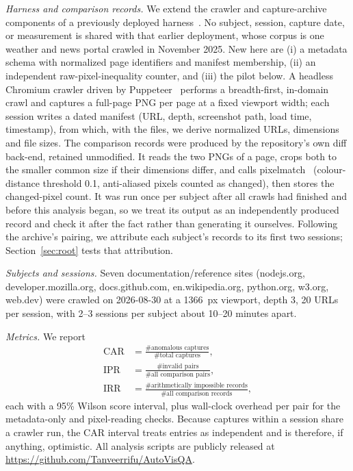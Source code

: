 \documentclass[conference]{IEEEtran}
\begin{document}
\textit{Harness and comparison records.} We extend the crawler and capture-archive components of a previously deployed harness~\cite{avqrepo}. No subject, session, capture date, or measurement is shared with that earlier deployment, whose corpus is one weather and news portal crawled in November 2025. New here are (i) a metadata schema with normalized page identifiers and manifest membership, (ii) an independent raw-pixel-inequality counter, and (iii) the pilot below. A headless Chromium crawler driven by Puppeteer~\cite{puppeteer} performs a breadth-first, in-domain crawl and captures a full-page PNG per page at a fixed viewport width; each session writes a dated manifest (URL, depth, screenshot path, load time, timestamp), from which, with the files, we derive normalized URLs, dimensions and file sizes. The comparison records were produced by the repository's own diff back-end, retained unmodified. It reads the two PNGs of a page, crops both to the smaller common size if their dimensions differ, and calls pixelmatch~\cite{pixelmatch} (colour-distance threshold 0.1, anti-aliased pixels counted as changed), then stores the changed-pixel count. It was run once per subject after all crawls had finished and before this analysis began, so we treat its output as an independently produced record and check it after the fact rather than generating it ourselves. Following the archive's pairing, we attribute each subject's records to its first two sessions; Section~\ref{sec:root} tests that attribution.

\textit{Subjects and sessions.} Seven documentation/reference sites (nodejs.org, developer.mozilla.org, docs.github.com, en.wikipedia.org, python.org, w3.org, web.dev) were crawled on 2026-08-30 at a 1366~px viewport, depth 3, 20 URLs per session, with 2--3 sessions per subject about 10--20 minutes apart.

\textit{Metrics.} We report
\begin{align}
\mathrm{CAR}&=\frac{\#\text{anomalous captures}}{\#\text{total captures}},\\
\mathrm{IPR}&=\frac{\#\text{invalid pairs}}{\#\text{all comparison pairs}},\\
\mathrm{IRR}&=\frac{\#\text{arithmetically impossible records}}{\#\text{all comparison records}},
\end{align}
each with a 95\% Wilson score interval, plus wall-clock overhead per pair for the metadata-only and pixel-reading checks. Because captures within a session share a crawler run, the CAR interval treats entries as independent and is therefore, if anything, optimistic. All analysis scripts are publicly released at \url{https://github.com/Tanveerrifu/AutoVisQA}.
\end{document}
